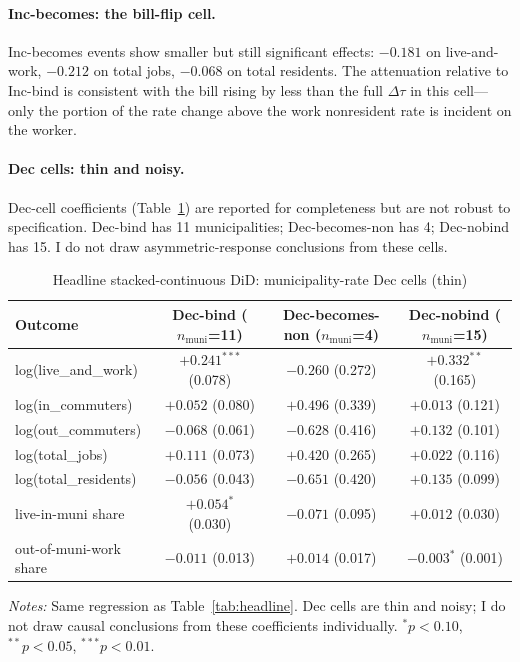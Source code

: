\documentclass[12pt]{article}
\begin{document}
\paragraph{Inc-becomes: the bill-flip cell.}
Inc-becomes events show smaller but still significant effects: $-0.181$
on live-and-work, $-0.212$ on total jobs, $-0.068$
on total residents. The attenuation relative to Inc-bind is
consistent with the bill rising by less than the full $\Delta\tau$ in
this cell---only the portion of the rate change above the work nonresident
rate is incident on the worker.

\paragraph{Dec cells: thin and noisy.}
Dec-cell coefficients (Table~\ref{tab:headline-dec}) are reported for
completeness but are not robust to specification. Dec-bind has 11 municipalities;
Dec-becomes-non has 4; Dec-nobind has 15. I do not draw asymmetric-response
conclusions from these cells.

\begin{table}[H]
    \centering
    \caption{Headline stacked-continuous DiD: municipality-rate Dec cells (thin)}
    \label{tab:headline-dec}
    \small
    \begin{tabular}{lccc}
        \toprule
        Outcome & Dec-bind ($n_{\text{muni}}$=11) & Dec-becomes-non ($n_{\text{muni}}$=4) & Dec-nobind ($n_{\text{muni}}$=15) \\
        \midrule
        log(live\_and\_work)    & $+0.241^{***}$  (0.078)  & $-0.260$  (0.272)        & $+0.332^{**}$ (0.165) \\
        log(in\_commuters)      & $+0.052$  (0.080)        & $+0.496$  (0.339)        & $+0.013$  (0.121) \\
        log(out\_commuters)     & $-0.068$  (0.061)        & $-0.628$  (0.416)        & $+0.132$  (0.101) \\
        log(total\_jobs)        & $+0.111$  (0.073)        & $+0.420$  (0.265)        & $+0.022$  (0.116) \\
        log(total\_residents)   & $-0.056$  (0.043)        & $-0.651$  (0.420)        & $+0.135$  (0.099) \\
        live-in-muni share         & $+0.054^{*}$  (0.030)    & $-0.071$  (0.095)        & $+0.012$  (0.030) \\
        out-of-muni-work share    & $-0.011$  (0.013)        & $+0.014$  (0.017)        & $-0.003^{*}$  (0.001) \\
        \bottomrule
    \end{tabular}
    \vspace{0.3em}
    \begin{minipage}{0.92\textwidth}
        \footnotesize \textit{Notes:} Same regression as Table~\ref{tab:headline}.
        Dec cells are thin and noisy; I do not draw causal conclusions from
        these coefficients individually.
        $^{*}p<0.10$, $^{**}p<0.05$, $^{***}p<0.01$.
    \end{minipage}
\end{table}
\end{document}
